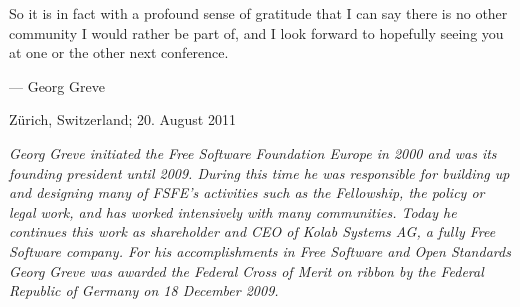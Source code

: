 So it is in fact with a profound sense of gratitude that I can say
there is no other community I would rather be part of, and I look
forward to hopefully seeing you at one or the other next conference.
\newline
\begin{flushright}--- Georg Greve\end{flushright}
\begin{flushright}Zürich, Switzerland; 20. August 2011\end{flushright}

\textit{Georg Greve initiated the Free Software Foundation Europe in
2000 and was its founding president until 2009. During this time he
was responsible for building up and designing many of FSFE's activities
such as the Fellowship, the policy or legal work, and has worked
intensively with many communities. Today he continues this work as
shareholder and CEO of Kolab Systems AG, a fully Free Software company.
For his accomplishments in Free Software and Open Standards Georg
Greve was awarded the Federal Cross of Merit on ribbon by the Federal
Republic of Germany on 18 December 2009.}

\newpage
